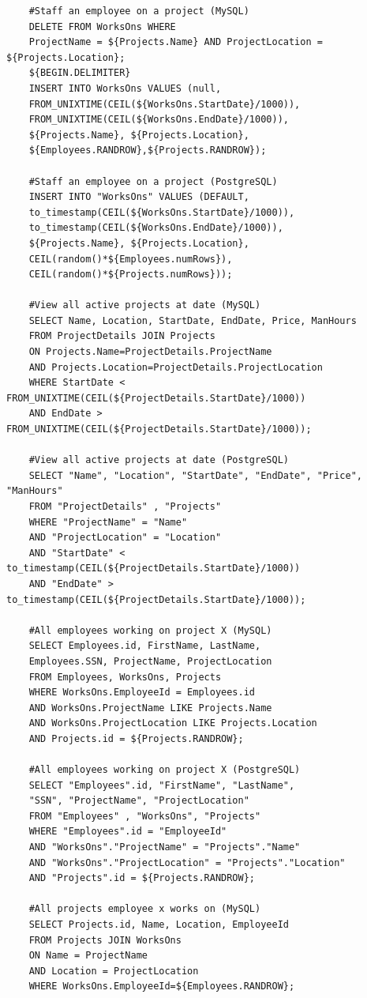 \documentclass[12pt]{article}
\begin{document}
\begin{spacing}{1.9}
\begin{verbatim}
	#Staff an employee on a project (MySQL)
	DELETE FROM WorksOns WHERE 
	ProjectName = ${Projects.Name} AND ProjectLocation = ${Projects.Location};
	${BEGIN.DELIMITER}
	INSERT INTO WorksOns VALUES (null,
	FROM_UNIXTIME(CEIL(${WorksOns.StartDate}/1000)),
	FROM_UNIXTIME(CEIL(${WorksOns.EndDate}/1000)),
	${Projects.Name}, ${Projects.Location},
	${Employees.RANDROW},${Projects.RANDROW});
	
	#Staff an employee on a project (PostgreSQL)
	INSERT INTO "WorksOns" VALUES (DEFAULT,
	to_timestamp(CEIL(${WorksOns.StartDate}/1000)),
	to_timestamp(CEIL(${WorksOns.EndDate}/1000)),
	${Projects.Name}, ${Projects.Location},
	CEIL(random()*${Employees.numRows}),
	CEIL(random()*${Projects.numRows}));
	
	#View all active projects at date (MySQL)
	SELECT Name, Location, StartDate, EndDate, Price, ManHours 
	FROM ProjectDetails JOIN Projects 
	ON Projects.Name=ProjectDetails.ProjectName 
	AND Projects.Location=ProjectDetails.ProjectLocation
	WHERE StartDate < FROM_UNIXTIME(CEIL(${ProjectDetails.StartDate}/1000)) 
	AND EndDate > FROM_UNIXTIME(CEIL(${ProjectDetails.StartDate}/1000));
	
	#View all active projects at date (PostgreSQL)
	SELECT "Name", "Location", "StartDate", "EndDate", "Price", "ManHours" 
	FROM "ProjectDetails" , "Projects"
	WHERE "ProjectName" = "Name" 
	AND "ProjectLocation" = "Location"
	AND "StartDate" < to_timestamp(CEIL(${ProjectDetails.StartDate}/1000))
	AND "EndDate" > to_timestamp(CEIL(${ProjectDetails.StartDate}/1000));
	
	#All employees working on project X (MySQL)
	SELECT Employees.id, FirstName, LastName, 
	Employees.SSN, ProjectName, ProjectLocation 
	FROM Employees, WorksOns, Projects 
	WHERE WorksOns.EmployeeId = Employees.id 
	AND WorksOns.ProjectName LIKE Projects.Name 
	AND WorksOns.ProjectLocation LIKE Projects.Location
	AND Projects.id = ${Projects.RANDROW};
	
	#All employees working on project X (PostgreSQL)
	SELECT "Employees".id, "FirstName", "LastName", 
	"SSN", "ProjectName", "ProjectLocation"
	FROM "Employees" , "WorksOns", "Projects"
	WHERE "Employees".id = "EmployeeId"
	AND "WorksOns"."ProjectName" = "Projects"."Name"
	AND "WorksOns"."ProjectLocation" = "Projects"."Location"
	AND "Projects".id = ${Projects.RANDROW};
	
	#All projects employee x works on (MySQL)
	SELECT Projects.id, Name, Location, EmployeeId 
	FROM Projects JOIN WorksOns 
	ON Name = ProjectName 
	AND Location = ProjectLocation
	WHERE WorksOns.EmployeeId=${Employees.RANDROW};
	

\end{verbatim}
\end{spacing}
\end{document}
